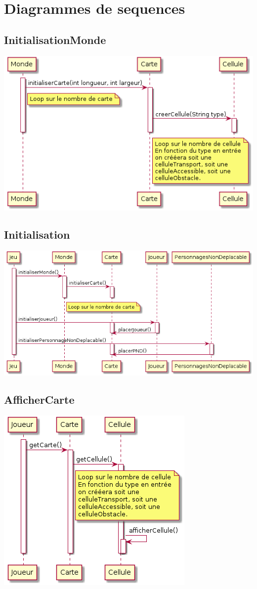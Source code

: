 \chapter{Diagrammes de sequences}
    \section{InitialisationMonde}
        \includegraphics[scale=0.5]{../graph/DiagrammeSequenceInitialisationMonde.png}
    \section{Initialisation}
        \includegraphics[scale=0.5]{../graph/DiagrammeSequenceInitialisation.png}
    \section{AfficherCarte}
        \includegraphics[scale=0.5]{../graph/DiagrammeSequenceAfficherCarte.png}
